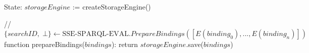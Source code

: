 State:
    $storageEngine$ := createStorageEngine()

// $\{ searchID, \; \bot \} \leftarrow \textrm{SSE-SPARQL-EVAL}.PrepareBindings([E(binding_0),...,E(binding_n)])$
function prepareBindings($bindings$):
    return $storageEngine$.save($bindings$) 